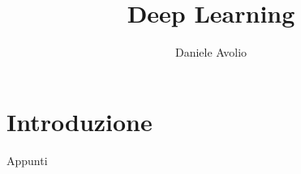 \documentclass{article}
\title{Deep Learning}
\author{Daniele Avolio}
\begin{document}
\maketitle
\newpage
\tableofcontents
\newpage
\section{Introduzione}
Appunti 




\end{document}
